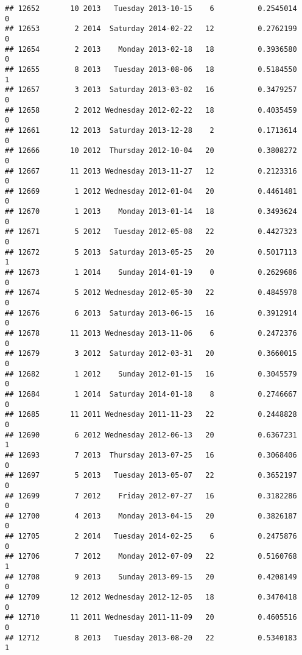 \documentclass[
]{article}
\begin{document}
\begin{verbatim}
## 12652       10 2013   Tuesday 2013-10-15    6          0.2545014             0
## 12653        2 2014  Saturday 2014-02-22   12          0.2762199             0
## 12654        2 2013    Monday 2013-02-18   18          0.3936580             0
## 12655        8 2013   Tuesday 2013-08-06   18          0.5184550             1
## 12657        3 2013  Saturday 2013-03-02   16          0.3479257             0
## 12658        2 2012 Wednesday 2012-02-22   18          0.4035459             0
## 12661       12 2013  Saturday 2013-12-28    2          0.1713614             0
## 12666       10 2012  Thursday 2012-10-04   20          0.3808272             0
## 12667       11 2013 Wednesday 2013-11-27   12          0.2123316             0
## 12669        1 2012 Wednesday 2012-01-04   20          0.4461481             0
## 12670        1 2013    Monday 2013-01-14   18          0.3493624             0
## 12671        5 2012   Tuesday 2012-05-08   22          0.4427323             0
## 12672        5 2013  Saturday 2013-05-25   20          0.5017113             1
## 12673        1 2014    Sunday 2014-01-19    0          0.2629686             0
## 12674        5 2012 Wednesday 2012-05-30   22          0.4845978             0
## 12676        6 2013  Saturday 2013-06-15   16          0.3912914             0
## 12678       11 2013 Wednesday 2013-11-06    6          0.2472376             0
## 12679        3 2012  Saturday 2012-03-31   20          0.3660015             0
## 12682        1 2012    Sunday 2012-01-15   16          0.3045579             0
## 12684        1 2014  Saturday 2014-01-18    8          0.2746667             0
## 12685       11 2011 Wednesday 2011-11-23   22          0.2448828             0
## 12690        6 2012 Wednesday 2012-06-13   20          0.6367231             1
## 12693        7 2013  Thursday 2013-07-25   16          0.3068406             0
## 12697        5 2013   Tuesday 2013-05-07   22          0.3652197             0
## 12699        7 2012    Friday 2012-07-27   16          0.3182286             0
## 12700        4 2013    Monday 2013-04-15   20          0.3826187             0
## 12705        2 2014   Tuesday 2014-02-25    6          0.2475876             0
## 12706        7 2012    Monday 2012-07-09   22          0.5160768             1
## 12708        9 2013    Sunday 2013-09-15   20          0.4208149             0
## 12709       12 2012 Wednesday 2012-12-05   18          0.3470418             0
## 12710       11 2011 Wednesday 2011-11-09   20          0.4605516             0
## 12712        8 2013   Tuesday 2013-08-20   22          0.5340183             1

\end{verbatim}
\end{document}
